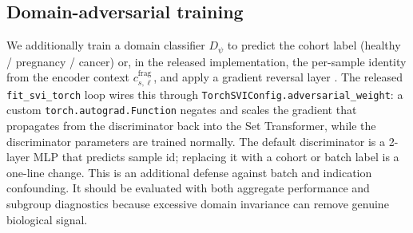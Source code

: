 \subsection{Domain-adversarial training}
We additionally train a domain classifier $D_\psi$ to predict the cohort label (healthy / pregnancy / cancer) or, in the released implementation, the per-sample identity from the encoder context $c^{\mathrm{frag}}_{s,\ell}$, and apply a gradient reversal layer \citep{ganin2016dann}. The released \texttt{fit\_svi\_torch} loop wires this through \texttt{TorchSVIConfig.adversarial\_weight}: a custom \texttt{torch.autograd.Function} negates and scales the gradient that propagates from the discriminator back into the Set Transformer, while the discriminator parameters are trained normally. The default discriminator is a 2-layer MLP that predicts sample id; replacing it with a cohort or batch label is a one-line change. This is an additional defense against batch and indication confounding. It should be evaluated with both aggregate performance and subgroup diagnostics because excessive domain invariance can remove genuine biological signal.

